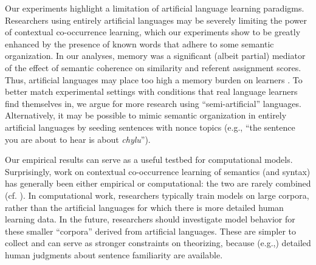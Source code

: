 \documentclass[man,floatsintext]{apa6}
\begin{document}

Our experiments highlight a limitation of artificial language learning paradigms. Researchers using entirely artificial languages may be severely limiting the power of contextual co-occurrence learning, which our experiments show to be greatly enhanced by the presence of known words that adhere to some semantic organization. In our analyses, memory was a significant (albeit partial) mediator of the effect of semantic coherence on similarity and referent assignment scores. Thus, artificial languages may place too high a memory burden on learners \citet{frank2011}. To better match experimental settings with conditions that real language learners find themselves in, we argue for more research using ``semi-artificial'' languages. Alternatively, it may be possible to mimic semantic organization in entirely artificial languages by seeding sentences with nonce topics (e.g., ``the sentence you are about to hear is about \emph{chylu}'').

Our empirical results can serve as a useful testbed for computational models. Surprisingly, work on contextual co-occurrence learning of semantics (and syntax) has generally been either empirical or computational: the two are rarely combined (cf. \citealp{qian2012}).  In computational work, researchers typically train models on large corpora, rather than the artificial languages for which there is more detailed human learning data. In the future, researchers should investigate model behavior for these smaller ``corpora'' derived from artificial languages. These are simpler to collect and can serve as stronger constraints on theorizing, because (e.g.,) detailed human judgments about sentence familiarity are available.

\end{document}
